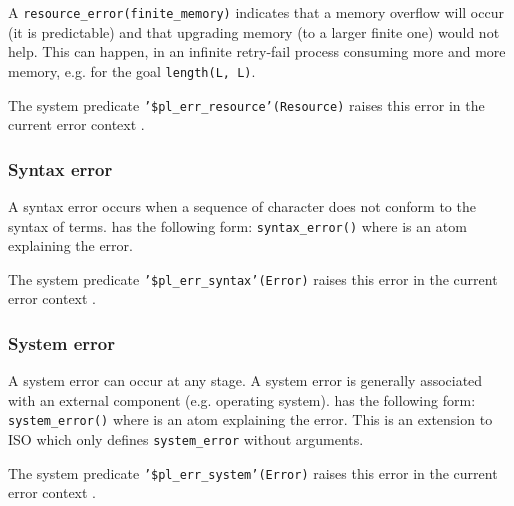 A \texttt{resource\_error(finite\_memory)} indicates that a memory
overflow will occur (it is predictable) and that upgrading memory (to
a larger finite one) would not help. This can happen, in an infinite
retry-fail process consuming more and more memory, e.g. for the goal
\texttt{length(L, L)}.

The system predicate \texttt{'\$pl\_err\_resource'(Resource)} raises this
error in the current error context .

\subsubsection{Syntax error}
\label{Syntax-error}
A syntax error occurs when a sequence of character does not conform to the
syntax of terms.  has the following form:
\texttt{syntax\_error()} where  is an
atom explaining the error.

The system predicate \texttt{'\$pl\_err\_syntax'(Error)} raises this
error in the current error context .

\subsubsection{System error}
A system error can occur at any stage. A system error is generally
associated with an external component (e.g. operating system).
 has the following form:
\texttt{system\_error()} where  is an
atom explaining the error. This is an extension to ISO which only defines
\texttt{system\_error} without arguments.

The system predicate \texttt{'\$pl\_err\_system'(Error)} raises this
error in the current error context .

